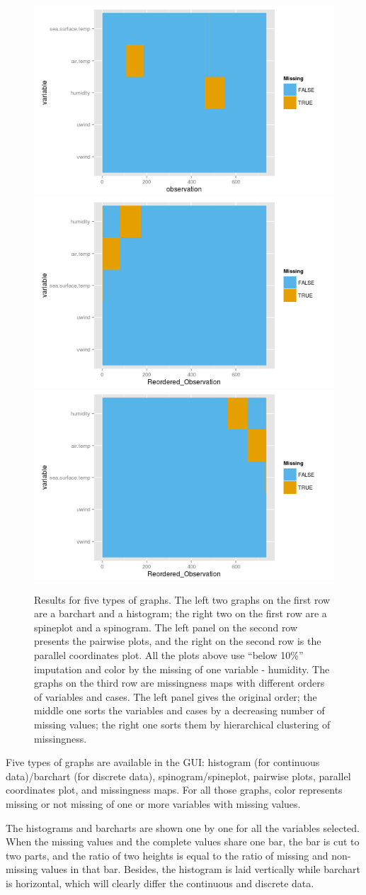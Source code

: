 \documentclass[article]{jss}
\begin{document}
\begin{center}
\begin{figure}[h]
\begin{centering}
\includegraphics[width=.32\textwidth]{graph/fig5-3-map-1}
\includegraphics[width=.32\textwidth]{graph/fig5-3-map-2}
\includegraphics[width=.32\textwidth]{graph/fig5-3-map-3}
\par\end{centering}
\caption{Results for five types of graphs.
The left two graphs on the first row are a barchart and a histogram; the right two on the first row are a spineplot and a spinogram. The left panel on the second row presents the pairwise plots, and the right on the second row is the parallel coordinates plot. All the plots above use ``below 10\%'' imputation and color by the missing of one variable - humidity. The graphs on the third row are missingness maps with different orders of variables and cases. The left panel gives the original order; the middle one sorts the variables and cases by a decreasing number of missing values; the right one sorts them by hierarchical clustering of missingness.}
\label{fig:graphtypes}
\end{figure}
\par\end{center}

Five types of graphs are available in the GUI: histogram (for continuous data)/barchart (for discrete data), spinogram/spineplot, pairwise plots, parallel coordinates plot, and missingness maps. For all those graphs, color represents missing or not missing of one or more variables with missing values. 

The histograms and barcharts are shown one by one for all the variables selected. When the missing values and the complete values share one bar, the bar is cut to two parts, and the ratio of two heights is equal to the ratio of missing and non-missing values in that bar. Besides, the histogram is laid vertically while barchart is horizontal, which will clearly differ the continuous and discrete data.
\end{document}
